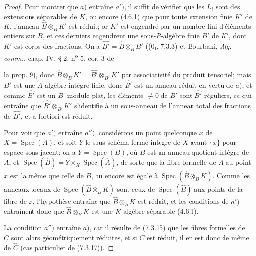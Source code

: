 \begin{proof}
Pour montrer que $a)$ entraîne $a')$, il suffit de vérifier que les $L_i$ sont
des extensions séparables de $K$, ou encore (4.6.1) que pour toute extension
finie $K'$ de $K$, l'anneau $\widehat B\otimes_BK'$ est réduit; or $K'$ est
engendré par un nombre fini d'éléments entiers sur $B$, et ces derniers
engendrent une sous-$B$-algèbre finie $B'$ de $K'$, dont $K'$ est corps des
fractions. On a $\widehat{B'}=\widehat B\otimes_BB'$
((0$_{\mathrm I}$, 7.3.3) et Bourbaki, \emph{Alg. comm.}, chap. IV, § 2,
n\textsuperscript{o} 5, cor. 3 de


la prop. 9), donc
$\widehat B\otimes_BK'=\widehat{B'}\otimes_{B'}K'$ par associativité du produit
tensoriel; mais $B'$ est une $A$-algèbre intègre finie, donc $\widehat{B'}$ est
un anneau réduit en vertu de $a)$, et comme $\widehat{B'}$ est un $B'$-module
plat, les éléments $\neq0$ de $B'$ sont $\widehat{B'}$-réguliers, ce qui
entraîne que $\widehat{B'}\otimes_{B'}K'$ s'identifie à un sous-anneau de
l'anneau total des fractions de $\widehat{B'}$, et a fortiori est réduit.

Pour voir que $a')$ entraîne $a'')$, considérons un point quelconque $x$ de
$X=\operatorname{Spec}(A)$, et soit $Y$ le sous-schéma fermé intègre de $X$
ayant $\overline{\{x\}}$ pour espace sous-jacent; on a
$Y=\operatorname{Spec}(B)$, où $B$ est un anneau quotient intègre de $A$, et
$\operatorname{Spec}(\widehat B)=Y\times_X\operatorname{Spec}(\widehat A)$,
de sorte que la fibre formelle de $A$ au point $x$ est la même que celle de
$B$, ou encore est égale à $\operatorname{Spec}(\widehat B\otimes_BK)$. Comme
les anneaux locaux de $\operatorname{Spec}(\widehat B\otimes_BK)$ sont ceux de
$\operatorname{Spec}(\widehat B)$ aux points de la fibre de $x$, l'hypothèse
entraîne que $\widehat B\otimes_BK$ est réduit, et les conditions de $a')$
entraînent donc que $\widehat B\otimes_BK$ est une $K$-algèbre séparable
(4.6.1).

La condition $a'')$ entraîne $a)$, car il résulte de (7.3.15) que les fibres
formelles de $C$ sont alors géométriquement réduites, et si $C$ est réduit, il
en est donc de même de $\widehat C$ (cas particulier de (7.3.17)).


\end{proof}
